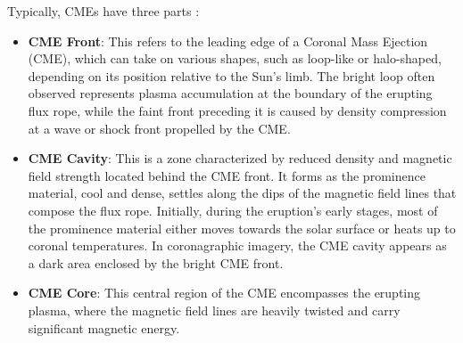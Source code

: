 Typically, CMEs have three parts \citep{vourlidas_2013}:
\begin{itemize}
	\item \textbf{CME Front}: This refers to the leading edge of a Coronal Mass Ejection (CME), which can take on various shapes, such as loop-like or halo-shaped, depending on its position relative to the Sun's limb. The bright loop often observed represents plasma accumulation at the boundary of the erupting flux rope, while the faint front preceding it is caused by density compression at a wave or shock front propelled by the CME.
	
	\item \textbf{CME Cavity}: This is a zone characterized by reduced density and magnetic field strength located behind the CME front. It forms as the prominence material, cool and dense, settles along the dips of the magnetic field lines that compose the flux rope. Initially, during the eruption's early stages, most of the prominence material either moves towards the solar surface or heats up to coronal temperatures. In coronagraphic imagery, the CME cavity appears as a dark area enclosed by the bright CME front.
	
	\item \textbf{CME Core}: This central region of the CME encompasses the erupting plasma, where the magnetic field lines are heavily twisted and carry significant magnetic energy.
\end{itemize}
